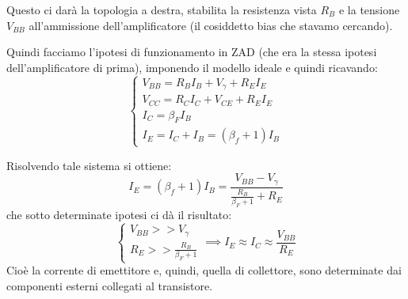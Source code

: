 \documentclass[a4paper,11pt]{article}
\begin{document}
Questo ci darà la topologia a destra, stabilita la resistenza vista $R_B$ e la tensione $V_{BB}$ all'ammissione dell'amplificatore (il cosiddetto bias che stavamo cercando).

Quindi facciamo l'ipotesi di funzionamento in ZAD (che era la stessa ipotesi dell'amplificatore di prima), imponendo il modello ideale e quindi ricavando:
\[
	\begin{cases}
		V_{BB} = R_B I_B + V_\gamma + R_E I_E \\
		V_{CC} = R_C I_C + V_{CE} + R_E I_E \\
		I_C = \beta_F I_B \\
		I_E = I_C + I_B = (\beta_f + 1)I_B
	\end{cases}
\]

Risolvendo tale sistema si ottiene:
$$
I_E = (\beta_f + 1)I_B = \frac{ V_{BB} - V_\gamma }{ \frac{R_B}{\beta_F + 1} + R_E }
$$
che sotto determinate ipotesi ci dà il risultato:
$$
\begin{cases}
	V_{BB} >> V_\gamma \\
	R_E >> \frac{R_B}{\beta_F + 1}
\end{cases} \implies
I_E \approx I_C \approx \frac{V_{BB}}{R_E} 
$$
Cioè la corrente di emettitore e, quindi, quella di collettore, sono determinate dai componenti esterni collegati al transistore.
\end{document}
